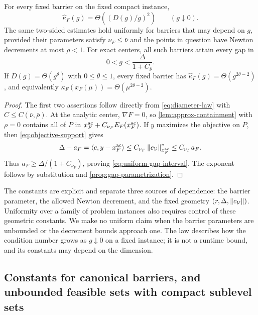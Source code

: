 \begin{corollary}
\label{cor:uniform-rates}
For every fixed barrier on the fixed compact instance,
\begin{equation}
 \widehat\kappa_F(g)=\Theta\!\left((D(g)/g)^2\right)
 \qquad(g\downarrow0).
 \label{eq:all-barrier-rate}
\end{equation}
The same two-sided estimates hold uniformly for barriers that may depend
on $g$, provided their parameters satisfy $\nu_F\leq\bar\nu$ and the
points in question have Newton decrements at most $\bar\rho<1$. For exact centers,
all such barriers attain every gap in
\begin{equation}
 0<g<\frac{\Delta}{1+C_{\bar\nu}}.
 \label{eq:uniform-gap-interval}
\end{equation}
If $D(g)=\Theta(g^\theta)$ with $0\leq\theta\leq1$, every fixed
barrier has $\widehat\kappa_F(g)=\Theta(g^{2\theta-2})$, and equivalently
$\kappa_F(x_F(\mu))=\Theta(\mu^{2\theta-2})$.
\end{corollary}

\begin{proof}
The first two assertions follow directly from
\eqref{eq:diameter-law} with $C\leq C(\bar\nu,\bar\rho)$.
At the analytic center, $\nabla F=0$, so
\cref{lem:approx-containment} with $\rho=0$ contains all of $P$ in
$x_F^{\rm ac}+C_{\nu_F}E_F(x_F^{\rm ac})$. If $y$ maximizes the
objective on $P$, then \eqref{eq:objective-support} gives
\[
 \Delta-a_F
 =\left\langle c,y-x_F^{\rm ac}\right\rangle
 \leq C_{\nu_F}\left\lVert c_{\mathcal V}\right\rVert_{x_F^{\rm ac}}^*
 \leq C_{\nu_F}a_F.
\]
Thus $a_F\geq\Delta/(1+C_{\nu_F})$, proving
\eqref{eq:uniform-gap-interval}. The exponent follows by substitution
and \cref{prop:gap-parametrization}.
\end{proof}

The constants are explicit and separate three sources of dependence:
the barrier parameter, the allowed Newton decrement, and the fixed geometry
$(r,\Delta,\left\lVert c_{\mathcal V}\right\rVert)$. Uniformity over a family of problem
instances also requires control of these geometric constants. We make
no uniform claim when the barrier parameters are unbounded or the
decrement bounds approach one. The law describes how the condition
number grows as $g\downarrow0$ on a fixed instance; it is not a runtime
bound, and its constants may depend on the dimension.

\subsection{Constants for canonical barriers, and unbounded feasible sets with compact sublevel sets}

